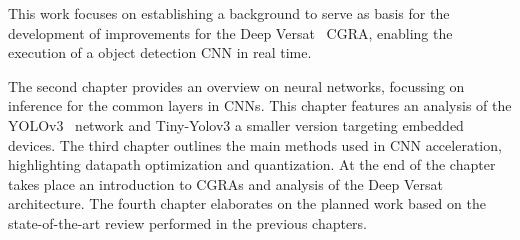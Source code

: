 This work focuses on establishing a background to serve as basis for the development of improvements for the Deep Versat~\cite{VMario:Deep_Versat} CGRA, enabling the execution of a object detection CNN in real time.

The second chapter provides an overview on neural networks, focussing on inference for the common layers in CNNs. This chapter features an analysis of the YOLOv3~\cite{yolov3} network and Tiny-Yolov3 a smaller version targeting embedded devices. The third chapter outlines the main methods used in CNN acceleration, highlighting datapath optimization and quantization. At the end of the chapter takes place an introduction to CGRAs and analysis of the Deep Versat~\cite{VMario:Deep_Versat} architecture. The fourth chapter elaborates on the planned work based on the state-of-the-art review performed in the previous chapters. %